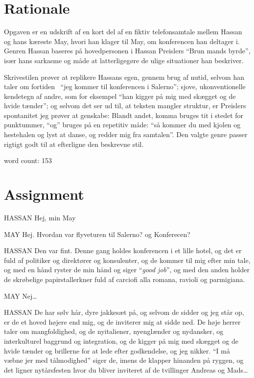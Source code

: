 \documentclass{article}
\begin{document}
\section{Rationale}

Opgaven er en udskrift af en kort del af en fiktiv telefonsamtale mellem Hassan og hans kæreste May, hvori han klager til May, om konferencen han deltager i. Genren Hassan baseres på hovedpersonen i Hassan Preislers ``Brun mands byrde'', især hans sarkasme og måde at latterligegøre de ulige situationer han beskriver.

Skrivestilen prøver at replikere Hassans egen, gennem brug af nutid, selvom han taler om fortiden \textendash\ ``jeg kommer til konferencen i Salerno''; sjove, ukonventionelle kendetegn af andre, som for eksempel ``han kigger på mig med skægget og de hvide tænder''; og selvom det ser ud til, at teksten mangler struktur, er Preislers spontanitet jeg prøver at genskabe: Blandt andet, komma bruges tit i stedet for punktummer, ``og'' bruges på en repetitiv måde: ``så kommer du med kjolen og hestehalen og lyst at danse, og redder mig fra samtalen''. Den valgte genre passer rigtigt godt til at efterligne den beskrevne stil.

word count: 153

\section{Assignment}

HASSAN Hej, min May

MAY Hej. Hvordan var flyveturen til Salerno? og Konferecen?

HASSAN Den var fint. Denne gang holdes konferencen i et lille hotel, og det er fuld af politiker og direktører og konsulenter, og de kommer til mig efter min tale, og med en hånd ryster de min hånd og siger ``\textit{good job}'', og med den anden holder de skrøbelige papirstallerkner fuld af carciofi alla romana, ravioli og parmigiana.

MAY Nej\ldots

HASSAN De har sølv hår, dyre jakkesæt på, og selvom de sidder og jeg står op, er de et hoved højere end mig, og de inviterer mig at sidde ned. De høje herrer taler om mangfoldighed, og de nyitaliener, nyenglænder og nydansker, og interkulturel baggrund og integration, og de kigger på mig med skægget og de hvide tænder og brillerne for at lede efter godkendelse, og jeg nikker. ``I må væbne jer med tålmodighed'' siger de, imens de klapper hinanden på ryggen, og det ligner nytårsfesten hvor du bliver inviteret af de tvillinger Andreas og Mads\ldots
\end{document}
